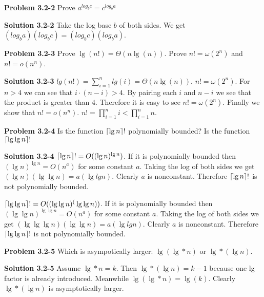 \documentclass{article}
\DeclarePairedDelimiter\ceil{\lceil}{\rceil}
\begin{document}
\hrulefill

\medskip

\textbf{Problem 3.2-2} Prove $a^{log_b c} = c^{log_b a}$

\medskip

\textbf{Solution 3.2-2} Take the log base $b$ of both sides. We get $(log_b a)(log_b c) = (log_b c)(log_b a)$.

\hrulefill

\medskip

\textbf{Problem 3.2-3} Prove $\lg(n!) = \Theta(n \lg(n))$. Prove $n! = \omega(2^n)$ and $n! = o(n^n)$.

\medskip

\textbf{Solution 3.2-3} $lg(n!) = \sum\limits_{i=1}^{n}lg(i) = \Theta(n \lg(n))$. $n! = \omega(2^n)$. For $n>4$ we can see that $i \cdot (n-i) > 4$. By pairing each $i$ and $n-i$ we see that the product is greater than $4$. Therefore it is easy to see $n! = \omega(2^n)$. Finally we show that $n! = o(n^n)$. $n! = \prod\limits_{i=1}^{n} i < \prod\limits_{i=1}^{n} n$.

\hrulefill

\medskip

\textbf{Problem 3.2-4} Is the function $\ceil{\lg n}!$ polynomially bounded? Is the function $\ceil{\lg\lg n}!$

\medskip

\textbf{Solution 3.2-4} $\ceil{\lg n}! = O((\lg n)^{\lg n})$. If it is polynomially bounded then $(\lg n)^{\lg n} = O(n^a)$ for some constant $a$. Taking the log of both sides we get $(\lg n)(\lg \lg n) = a(\lg lg n)$. Clearly $a$ is nonconstant. Therefore $\ceil{\lg n}!$ is not polynomially bounded.

$\ceil{\lg\lg n}! = O((\lg \lg n)^(\lg \lg n))$. If it is polynomially bounded then $(\lg \lg n)^{\lg \lg n} = O(n^a)$ for some constant $a$. Taking the log of both sides we get $(\lg \lg \lg n)(\lg \lg n) = a(\lg lg n)$. Clearly $a$ is nonconstant. Therefore $\ceil{\lg \lg n}!$ is not polynomially bounded.

\hrulefill

\medskip

\textbf{Problem 3.2-5} Which is asympotically larger: $\lg(\lg*n)$ or $\lg*(\lg n)$.

\medskip

\textbf{Solution 3.2-5} Assume $\lg*n = k$. Then $\lg*(\lg n) = k - 1$ because one lg factor is already introduced. Meanwhile $\lg(\lg*n) = \lg(k)$. Clearly $\lg*(\lg n)$ is asymptotically larger.
\end{document}
